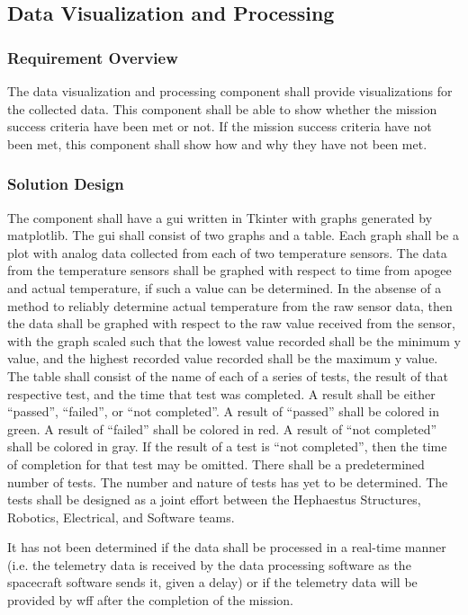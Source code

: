 \documentclass[letterpaper,10pt]{article}
\begin{document}
\subsection{Data Visualization and Processing}
\subsubsection{Requirement Overview}
The data visualization and processing component shall provide visualizations
for the collected data.
This component shall be able to show whether the mission success criteria have
been met or not.
If the mission success criteria have not been met, this component shall show how
and why they have not been met.

\subsubsection{Solution Design}
The component shall have a \gls{gui} written in Tkinter with graphs generated by
\gls{matplotlib}.
The \gls{gui} shall consist of two graphs and a table.
Each graph shall be a \gls{plot} with analog data collected from each of two temperature sensors.
The data from the temperature sensors shall be graphed with respect to time from
\gls{apogee} and actual temperature, if such a value can be determined.
In the absense of a method to reliably determine actual temperature from the raw
sensor data, then the data shall be graphed with respect to the raw value received
from the sensor, with the graph scaled such that the lowest value recorded shall be
the minimum y value, and the highest recorded value recorded shall be the maximum y value.
The table shall consist of the name of each of a series of tests,
the result of that respective test, and the time that test was completed.
A result shall be either ``passed'', ``failed'', or ``not completed''.
A result of ``passed'' shall be colored in green.
A result of ``failed'' shall be colored in red.
A result of ``not completed'' shall be colored in gray.
If the result of a test is ``not completed'', then the time of completion for that test
may be omitted.
There shall be a predetermined number of tests.
The number and nature of tests has yet to be determined.
The tests shall be designed as a joint effort between the Hephaestus Structures,
Robotics, Electrical, and Software teams.

It has not been determined if the data shall be processed in a real-time manner
(i.e. the telemetry data is received by the data processing software as the
spacecraft software sends it, given a delay) or if the telemetry data will be provided
by \gls{wff} after the completion of the mission.
\end{document}
